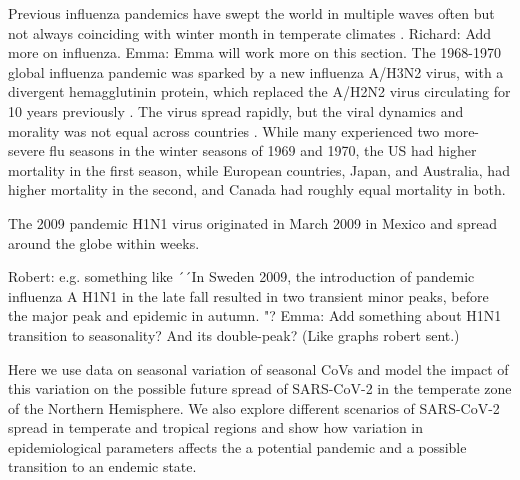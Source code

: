 \documentclass[rmp, reprint, superscriptaddress, floatfix,amsmath]{revtex4-1}
\newcommand{\Richard}[1]{{\color{drab}Richard: #1}}
\newcommand{\Robert}[1]{{\color{celestialblue}Robert: #1}}
\newcommand{\Jan}[1]{{\color{deepsaffron}Jan: #1}}
\newcommand{\Emma}[1]{{\color{purple}Emma: #1}}
\begin{document}

Previous influenza pandemics have swept the world in multiple waves often but not always coinciding with winter month in temperate climates \citep{taubenberger_1918_2019,viboud_multinational_2005,viboud_global_2016}. 
\Richard{Add more on influenza}. \Emma{Emma will work more on this section.}
The 1968-1970 global influenza pandemic was sparked by a new influenza A/H3N2 virus, with a divergent hemagglutinin protein, which replaced the A/H2N2 virus circulating for 10 years previously \citep{viboud_multinational_2005}. The virus spread rapidly, but the viral dynamics and morality was not equal across countries \citep{viboud_multinational_2005}. While many experienced two more-severe flu seasons in the winter seasons of 1969 and 1970, the US had higher mortality in the first season, while European countries, Japan, and Australia, had higher mortality in the second, and Canada had roughly equal mortality in both.

The 2009 pandemic H1N1 virus originated in March 2009 in Mexico and spread around the globe within weeks.

\Robert{e.g. something like ´´In Sweden 2009, the introduction of pandemic influenza A H1N1 in the late fall resulted in two transient minor peaks, before the major peak and epidemic in autumn. \citep{SMI2011}"?}
\Emma{Add something about H1N1 transition to seasonality? And its double-peak? (Like graphs robert sent.)}

Here we use data on seasonal variation of seasonal CoVs and model the impact of this variation on the possible future spread of SARS-CoV-2 in the temperate zone of the Northern Hemisphere. 
We also explore different scenarios of SARS-CoV-2 spread in temperate and tropical regions and show how variation in epidemiological parameters affects the a potential pandemic and a possible transition to an endemic state. 
\end{document}
